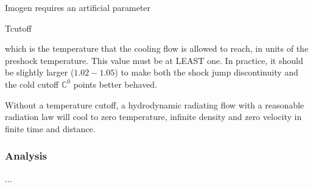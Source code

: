 Imogen requires an artificial parameter \begin{tt}Tcutoff\end{tt} which is the temperature that the cooling flow is allowed
to reach, in units of the preshock temperature. This value must be at LEAST one. In practice, it should be slightly
larger ($1.02-1.05$) to make both the shock jump discontinuity and the cold cutoff $\mathbb{C}^0$ points better behaved.

Without a temperature cutoff, a hydrodynamic radiating flow with a reasonable radiation law will cool to zero temperature,
infinite density and zero velocity in finite time and distance.

\subsubsection{Analysis}

...
